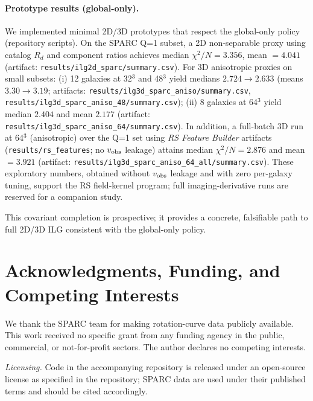 \documentclass[fleqn,usenatbib]{mnras}
\begin{document}
\paragraph{Prototype results (global-only).} We implemented minimal 2D/3D prototypes that respect the global-only policy (repository scripts). On the SPARC Q=1 subset, a 2D non-separable proxy using catalog $R_d$ and component ratios achieves median $\chi^2/N=\mathbf{3.356}$, mean $=\mathbf{4.041}$ (artifact: \texttt{results/ilg2d\_sparc/summary.csv}). For 3D anisotropic proxies on small subsets: (i) 12 galaxies at 32$^3$ and 48$^3$ yield medians $\mathbf{2.724}\to\mathbf{2.633}$ (means $\mathbf{3.30}\to\mathbf{3.19}$; artifacts: \texttt{results/ilg3d\_sparc\_aniso/summary.csv}, \texttt{results/ilg3d\_sparc\_aniso\_48/summary.csv}); (ii) 8 galaxies at 64$^3$ yield median $\mathbf{2.404}$ and mean $\mathbf{2.177}$ (artifact: \texttt{results/ilg3d\_sparc\_aniso\_64/summary.csv}). In addition, a full-batch 3D run at 64$^3$ (anisotropic) over the Q=1 set using \emph{RS Feature Builder} artifacts (\texttt{results/rs\_features}; no $v_{\rm obs}$ leakage) attains median $\chi^2/N = \mathbf{2.876}$ and mean $=\mathbf{3.921}$ (artifact: \texttt{results/ilg3d\_sparc\_aniso\_64\_all/summary.csv}). These exploratory numbers, obtained without $v_{\rm obs}$ leakage and with zero per-galaxy tuning, support the RS field-kernel program; full imaging-derivative runs are reserved for a companion study.

\medskip
\noindent This covariant completion is prospective; it provides a concrete, falsifiable path to full 2D/3D ILG consistent with the global-only policy.

\section*{Acknowledgments, Funding, and Competing Interests}
\noindent We thank the SPARC team for making rotation-curve data publicly available. This work received no specific grant from any funding agency in the public, commercial, or not-for-profit sectors. The author declares no competing interests.

\noindent \textit{Licensing.} Code in the accompanying repository is released under an open-source license as specified in the repository; SPARC data are used under their published terms and should be cited accordingly.
\end{document}
